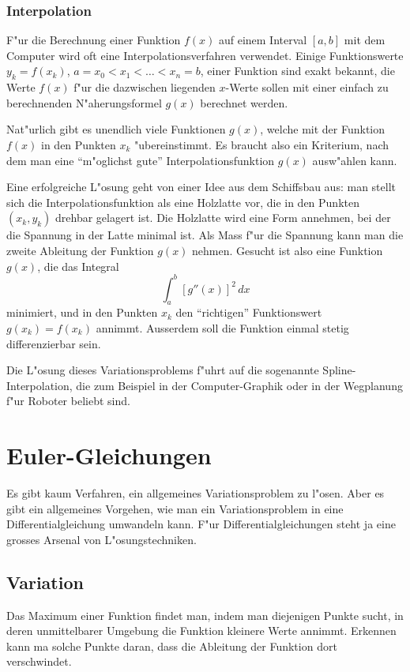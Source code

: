 \subsubsection{Interpolation}
F"ur die Berechnung einer Funktion $f(x)$ auf einem Interval
$[a,b]$ mit dem Computer wird oft eine Interpolationsverfahren verwendet.
Einige Funktionswerte $y_k=f(x_k)$, $a=x_0<x_1<\dots <x_n = b$,
einer Funktion sind exakt bekannt,
die Werte $f(x)$ f"ur die dazwischen liegenden $x$-Werte sollen
mit einer einfach zu berechnenden N"aherungsformel $g(x)$ berechnet
werden. 

Nat"urlich gibt es unendlich viele Funktionen $g(x)$, welche mit der
Funktion $f(x)$ in den Punkten $x_k$ "ubereinstimmt.
Es braucht also ein Kriterium, nach dem man eine ``m"oglichst gute''
Interpolationsfunktion $g(x)$ ausw"ahlen kann.

Eine erfolgreiche L"osung geht von einer Idee aus dem Schiffsbau aus:
man stellt sich die Interpolationsfunktion als eine Holzlatte vor, die
in den Punkten $(x_k,y_k)$ drehbar gelagert ist. Die Holzlatte wird
eine Form annehmen, bei der die Spannung in der Latte minimal ist.
Als Mass f"ur die Spannung kann man die zweite Ableitung der Funktion $g(x)$
nehmen. Gesucht ist also eine Funktion $g(x)$, die das Integral
\[
\int_a^b [g''(x)]^2\,dx
\]
minimiert, und in den Punkten $x_k$ den ``richtigen'' Funktionswert 
$g(x_k)=f(x_k)$ annimmt. Ausserdem soll die Funktion einmal stetig 
differenzierbar sein.

Die L"osung dieses Variationsproblems f"uhrt auf die sogenannte
Spline-Interpolation, die zum Beispiel in der Computer-Graphik oder
in der Wegplanung f"ur Roboter beliebt sind.

\section{Euler-Gleichungen}
Es gibt kaum Verfahren, ein allgemeines Variationsproblem zu l"osen.
Aber es gibt ein allgemeines Vorgehen, wie man ein Variationsproblem
in eine Differentialgleichung umwandeln kann. F"ur Differentialgleichungen
steht ja eine grosses Arsenal von L"osungstechniken.
\subsection{Variation}
Das Maximum einer Funktion findet man, indem man diejenigen
Punkte sucht, in deren unmittelbarer Umgebung die Funktion kleinere
Werte annimmt. Erkennen kann ma solche Punkte daran, dass die Ableitung
der Funktion dort verschwindet.

